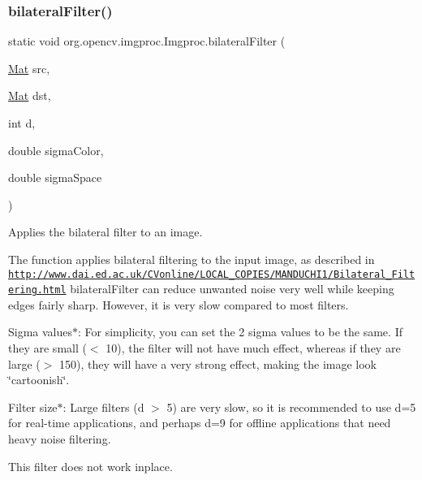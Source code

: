 \subsubsection{\texorpdfstring{bilateral\+Filter()}{bilateralFilter()}\hspace{0.1cm}{\footnotesize\ttfamily [2/2]}}
{\footnotesize\ttfamily static void org.\+opencv.\+imgproc.\+Imgproc.\+bilateral\+Filter (\begin{DoxyParamCaption}\item[{\mbox{\hyperlink{classorg_1_1opencv_1_1core_1_1_mat}{Mat}}}]{src,  }\item[{\mbox{\hyperlink{classorg_1_1opencv_1_1core_1_1_mat}{Mat}}}]{dst,  }\item[{int}]{d,  }\item[{double}]{sigma\+Color,  }\item[{double}]{sigma\+Space }\end{DoxyParamCaption})\hspace{0.3cm}{\ttfamily [static]}}

Applies the bilateral filter to an image.

The function applies bilateral filtering to the input image, as described in \href{http://www.dai.ed.ac.uk/CVonline/LOCAL_COPIES/MANDUCHI1/Bilateral_Filtering.html}{\tt http\+://www.\+dai.\+ed.\+ac.\+uk/\+C\+Vonline/\+L\+O\+C\+A\+L\+\_\+\+C\+O\+P\+I\+E\+S/\+M\+A\+N\+D\+U\+C\+H\+I1/\+Bilateral\+\_\+\+Filtering.\+html} {\ttfamily bilateral\+Filter} can reduce unwanted noise very well while keeping edges fairly sharp. However, it is very slow compared to most filters.


\begin{DoxyItemize}
\item Sigma values$\ast$\+: For simplicity, you can set the 2 sigma values to be the same. If they are small ($<$ 10), the filter will not have much effect, whereas if they are large ($>$ 150), they will have a very strong effect, making the image look \char`\"{}cartoonish\char`\"{}. 
\item Filter size$\ast$\+: Large filters (d $>$ 5) are very slow, so it is recommended to use d=5 for real-\/time applications, and perhaps d=9 for offline applications that need heavy noise filtering. 
\end{DoxyItemize}

This filter does not work inplace.



